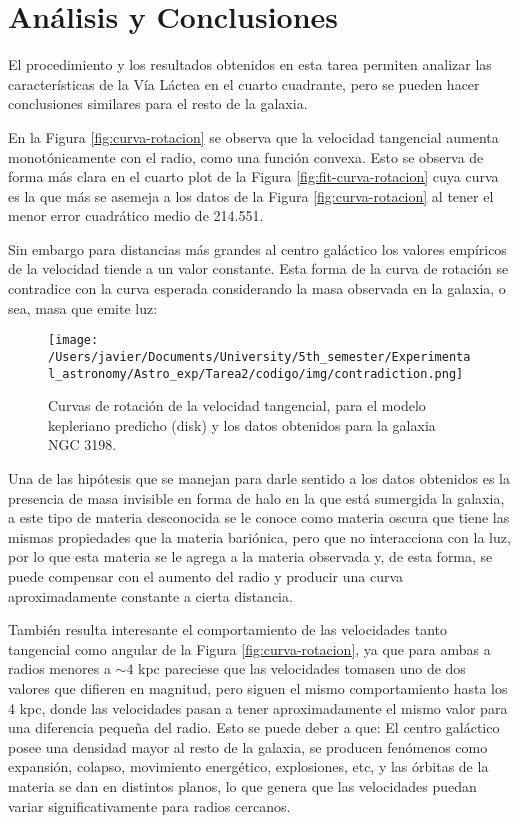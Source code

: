 \documentclass[letterpaper,oneside]{article}
\begin{document}
\section{Análisis y Conclusiones}
El procedimiento y los resultados obtenidos en esta tarea permiten analizar las características de la Vía Láctea en el cuarto cuadrante, pero se pueden hacer conclusiones similares para el resto de la galaxia.

En la Figura \ref{fig:curva-rotacion} se observa que la velocidad tangencial aumenta monotónicamente con el radio, como una función convexa. Esto se observa de forma más clara en el cuarto plot de la Figura \ref{fig:fit-curva-rotacion} cuya curva es la que más se asemeja a los datos de la Figura \ref{fig:curva-rotacion} al tener el menor error cuadrático medio de 214.551.

Sin embargo para distancias más grandes al centro galáctico los valores empíricos de la velocidad tiende a un valor constante. Esta forma de la curva de rotación se contradice con la curva esperada considerando la masa observada en la galaxia, o sea, masa que emite luz:

\begin{figure}[H]
    \centering
    \texttt{[image: /Users/javier/Documents/University/5th\_semester/Experimental\_astronomy/Astro\_exp/Tarea2/codigo/img/contradiction.png]}
    \caption{Curvas de rotación de la velocidad tangencial, para el modelo kepleriano predicho (disk) y los datos obtenidos para la galaxia NGC 3198.}
    \label{fig:contradiction}
\end{figure}

Una de las hipótesis que se manejan para darle sentido a los datos obtenidos es la presencia de masa invisible en forma de halo en la que está sumergida la galaxia, a este tipo de materia desconocida se le conoce como materia oscura que tiene las mismas propiedades que la materia bariónica, pero que no interacciona con la luz, por lo que esta materia se le agrega a la materia observada y, de esta forma, se puede compensar con el aumento del radio y producir una curva aproximadamente constante a cierta distancia.


También resulta interesante el comportamiento de las velocidades tanto tangencial como angular de la Figura \ref{fig:curva-rotacion}, ya que para ambas a radios menores a $\sim 4$ kpc pareciese que las velocidades tomasen uno de dos valores que difieren en magnitud, pero siguen el mismo comportamiento hasta los 4 kpc, donde las velocidades pasan a tener aproximadamente el mismo valor para una diferencia pequeña del radio. Esto se puede deber a que: El centro galáctico posee una densidad mayor al resto de la galaxia, se producen fenómenos como expansión, colapso, movimiento energético, explosiones, etc, y las órbitas de la materia se dan en distintos planos, lo que genera que las velocidades puedan variar significativamente para radios cercanos.
\end{document}
